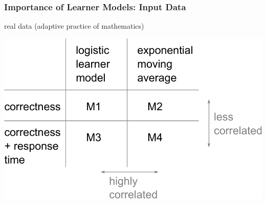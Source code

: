 \documentclass[bigger]{beamer}
\begin{document}




\begin{frame}
  \frametitle{Importance of Learner Models: Input Data}

  \begin{center}
  real data (adaptive practice of mathematics)

  \bigskip

    \includegraphics[width=.7\linewidth]{response-time-experiment}
  \end{center}


\end{frame}
\end{document}

